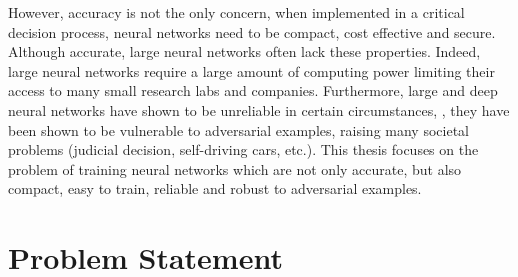 However, accuracy is not the only concern, when implemented in a critical decision process, neural networks need to be compact, cost effective and secure.
Although accurate, large neural networks often lack these properties.
Indeed, large neural networks require a large amount of computing power limiting their access to many small research labs and companies.
Furthermore, large and deep neural networks have shown to be unreliable in certain circumstances, \ie, they have been shown to be vulnerable to adversarial examples, raising many societal problems (judicial decision, self-driving cars, etc.).
This thesis focuses on the problem of training neural networks which are not only accurate, but also compact, easy to train, reliable and robust to adversarial examples.

%

\section{Problem Statement}
\label{section:ch1-problem_setting}




